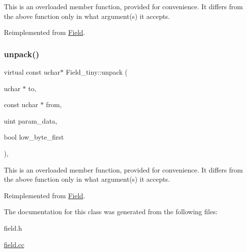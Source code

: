 This is an overloaded member function, provided for convenience. It differs from the above function only in what argument(s) it accepts.

Reimplemented from \mbox{\hyperlink{classField_a9eaff8d3425ef0e1da69b32cbd8f2879}{Field}}.

\mbox{\label{classField__tiny_a1be4d9de39cf9efe57b276614f8f1bf9}} 
\subsubsection{\texorpdfstring{unpack()}{unpack()}}
{\footnotesize\ttfamily virtual const uchar$\ast$ Field\+\_\+tiny\+::unpack (\begin{DoxyParamCaption}\item[{uchar $\ast$}]{to,  }\item[{const uchar $\ast$}]{from,  }\item[{uint}]{param\+\_\+data,  }\item[{bool}]{low\+\_\+byte\+\_\+first }\end{DoxyParamCaption})\hspace{0.3cm}{\ttfamily [inline]}, {\ttfamily [virtual]}}

This is an overloaded member function, provided for convenience. It differs from the above function only in what argument(s) it accepts.

Reimplemented from \mbox{\hyperlink{classField_a42f448ff2c939d91949f7635d939b16b}{Field}}.



The documentation for this class was generated from the following files\+:\begin{DoxyCompactItemize}
\item 
field.\+h\item 
\mbox{\hyperlink{field_8cc}{field.\+cc}}\end{DoxyCompactItemize}
